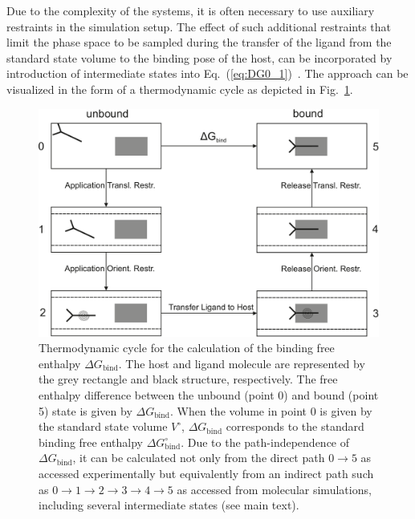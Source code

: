 \documentclass[9pt,lessons,pubversion]{livecoms}
\begin{document}
Due to the complexity of the systems, it is often necessary to use auxiliary restraints in the simulation setup. 
The effect of such additional restraints that limit the phase space to be sampled during the transfer of the ligand from the standard state volume to the binding pose of the host, 
can be incorporated by introduction of intermediate states into Eq.~(\ref{eq:DG0_1})~\cite{woo2005calculation}.
The approach can be visualized in the form of a thermodynamic cycle as depicted in Fig.~\ref{fig:thermo_cycle}.
\begin{figure}[htb!]
\includegraphics[width=\linewidth]{figures/thermocycle.pdf}
\caption{Thermodynamic cycle for the calculation of the binding free enthalpy $\Delta G_\mathrm{bind}$.
The host and ligand molecule are represented by the grey rectangle and black structure, respectively.
The free enthalpy difference between the unbound (point 0) and bound (point 5) state is given by $\Delta G_\mathrm{bind}$. 
When the volume in point 0 is given by  the standard state volume $V^\circ$, $\Delta G_\mathrm{bind}$ corresponds to the standard binding free enthalpy $\Delta G^\circ_\mathrm{bind}$.
Due to the path-independence of $\Delta G_\mathrm{bind}$, it can be calculated not only from the direct path $0 \rightarrow 5$ as accessed experimentally but equivalently from an indirect path such as 
$0 \rightarrow 1  \rightarrow 2  \rightarrow 3  \rightarrow 4  \rightarrow 5$ as accessed from molecular simulations, including several intermediate states (see main text).
}
\label{fig:thermo_cycle}
\end{figure}
\end{document}
